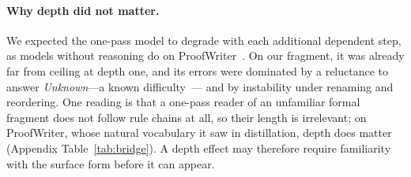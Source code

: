 \paragraph{Why depth did not matter.}
We expected the one-pass model to degrade with each additional dependent step, as models without reasoning do on ProofWriter~\citep{harddecisions2026}.
On our fragment, it was already far from ceiling at depth one, and its errors were dominated by a reluctance to answer \emph{Unknown}---a known difficulty~\citep{qmfol2026,harddecisions2026}--- and by instability under renaming and reordering.
One reading is that a one-pass reader of an unfamiliar formal fragment does not follow rule chains at all, so their length is irrelevant; on ProofWriter, whose natural vocabulary it saw in distillation, depth does matter (Appendix Table~\ref{tab:bridge}).
A depth effect may therefore require familiarity with the surface form before it can appear.
